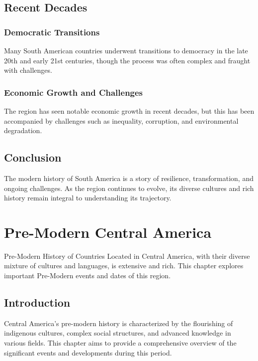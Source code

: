\documentclass{book}
\begin{document}
\section{Recent Decades}
\label{sec:recent-decades}

\subsection{Democratic Transitions}
\label{subsec:democratic-transitions}
Many South American countries underwent transitions to democracy in the late 20th and early 21st centuries, though the process was often complex and fraught with challenges.

\subsection{Economic Growth and Challenges}
\label{subsec:economic-growth-challenges}
The region has seen notable economic growth in recent decades, but this has been accompanied by challenges such as inequality, corruption, and environmental degradation.

\section{Conclusion}
\label{sec:conclusion-modern-south-america}
The modern history of South America is a story of resilience, transformation, and ongoing challenges. As the region continues to evolve, its diverse cultures and rich history remain integral to understanding its trajectory.

\chapter{Pre-Modern Central America}
\label{ch:pre-modern-history-central-america}

Pre-Modern History of Countries Located in Central America, with their diverse mixture of cultures and languages, is extensive and rich. This chapter explores important Pre-Modern events and dates of this region.

\section{Introduction}
\label{sec:introduction-pre-modern-central-america}
Central America’s pre-modern history is characterized by the flourishing of indigenous cultures, complex social structures, and advanced knowledge in various fields. This chapter aims to provide a comprehensive overview of the significant events and developments during this period.
\end{document}
